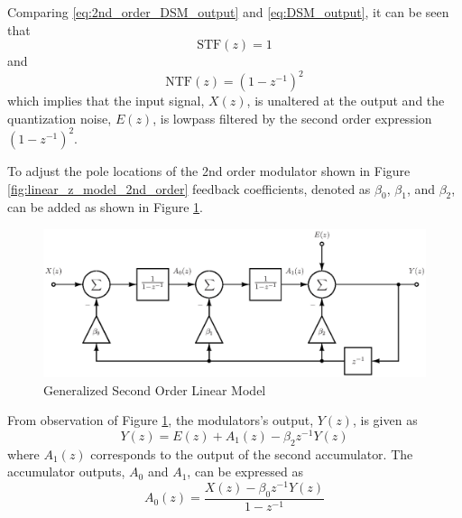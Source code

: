 Comparing \eqref{eq:2nd_order_DSM_output} and \eqref{eq:DSM_output}, it can be seen that
\begin{equation}\label{eq:second_order_STF}
   \text{STF}(z)=1
\end{equation}
and
\begin{equation}\label{eq:second_order_NTF}
   \text{NTF}(z)=\left(1-z^{-1}\right)^2
\end{equation}
which implies that the input signal, $X(z)$, is unaltered at the output and the
quantization noise, $E(z)$, is lowpass filtered by the second order expression
$\left(1-z^{-1}\right)^2$.

To adjust the pole locations of the 2nd order \DS modulator shown in Figure
\ref{fig:linear_z_model_2nd_order} feedback coefficients, denoted as $\beta_0$, $\beta_1$,
 and $\beta_2$, can be added as shown in Figure
\ref{fig:linear_z_model_2nd_order_complex}. 
\begin{figure}
  \centering
  \includegraphics[width=\textwidth]{./final_figures/second_order_complex_model.eps}
  \caption{Generalized Second Order Linear Model}
  \label{fig:linear_z_model_2nd_order_complex}
\end{figure}
From observation of Figure \ref{fig:linear_z_model_2nd_order_complex}, the \DS
modulators's output, $Y(z)$, is given as 
\begin{equation}\label{eq:2nd_order_DSM_output_complex_1}
 Y(z) = E(z)+A_1(z)-\beta_2 z^{-1}Y(z)
\end{equation}
where $A_1(z)$ corresponds to the output of the second accumulator. The accumulator
outputs, $A_{0}$ and $A_{1}$, can be expressed as
\begin{equation}\label{eq:2nd_order_DSM_accumulator_0_complex}
  A_{0}(z) = \frac{X(z)-\beta_0 z^{-1}Y(z)}{1-z^{-1}} 
\end{equation}
